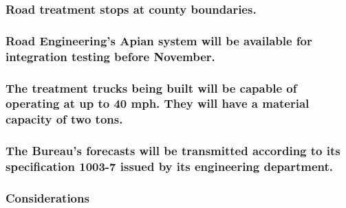 \documentclass[
]{article}
\begin{document}
\hypertarget{road-treatment-stops-at-county-boundaries.}{%
\subsubsection{Road treatment stops at county
boundaries.}\label{road-treatment-stops-at-county-boundaries.}}

\hypertarget{road-engineerings-apian-system-will-be-available-for-integration-testing-before-november.}{%
\subsubsection{\texorpdfstring{ Road Engineering's Apian system will be
available for integration testing before November.
}{ Road Engineering's Apian system will be available for integration testing before November. }}\label{road-engineerings-apian-system-will-be-available-for-integration-testing-before-november.}}

\hypertarget{the-treatment-trucks-being-built-will-be-capable-of-operating-at-up-to-40-mph.-they-will-have-a-material-capacity-of-two-tons.}{%
\subsubsection{The treatment trucks being built will be capable of
operating at up to 40 mph. They will have a material capacity of two
tons.}\label{the-treatment-trucks-being-built-will-be-capable-of-operating-at-up-to-40-mph.-they-will-have-a-material-capacity-of-two-tons.}}

\hypertarget{the-bureaus-forecasts-will-be-transmitted-according-to-its-specification-1003-7-issued-by-its-engineering-department.}{%
\subsubsection{The Bureau's forecasts will be transmitted according to
its specification 1003-7 issued by its engineering
department.}\label{the-bureaus-forecasts-will-be-transmitted-according-to-its-specification-1003-7-issued-by-its-engineering-department.}}

\hypertarget{considerations-11}{%
\subsubsection{Considerations}\label{considerations-11}}
\end{document}
